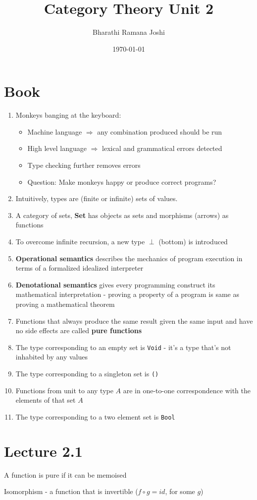 \documentclass[titlepage, 12pt]{article}
\begin{document}
\title{Category Theory Unit 2}

\author{Bharathi Ramana Joshi}

\date{\today}

\maketitle

\newpage

\section{Book}
\begin{enumerate}
	\item Monkeys banging at the keyboard:
		\begin{itemize}
			\item Machine language $\Rightarrow$ any combination produced should be run
			\item High level language $\Rightarrow$ lexical and grammatical errors detected
			\item Type checking further removes errors
			\item Question: Make monkeys happy or produce correct programs?
		\end{itemize}
	\item Intuitively, types are (finite or infinite) sets of values.
	\item A category of sets, \textbf{Set} has objects as sets and morphisms
		(arrows) as functions
	\item To overcome infinite recursion, a new type $\perp$ (bottom) is introduced
	\item \textbf{Operational semantics} describes the mechanics of program execution in
		terms of a formalized idealized interpreter
	\item \textbf{Denotational semantics} gives every programming construct its
		mathematical interpretation - proving a property of a program is same as
		proving a mathematical theorem
	\item Functions that always produce the same result given the same input and
		have no side effects are called \textbf{pure functions}
	\item The type corresponding to an empty set is \lstinline{Void} - it's a
		type that's not inhabited by any values
	\item The type corresponding to a singleton set is \lstinline{()}
	\item Functions from unit to any type $A$ are in one-to-one correspondence
		with the elements of that set $A$
	\item The type corresponding to a two element set is \lstinline{Bool}
\end{enumerate}

\section{Lecture 2.1}

A function is pure if it can be memoised

Isomorphism - a function that is invertible ($f\circ g = id$, for some $g$)
\end{document}
